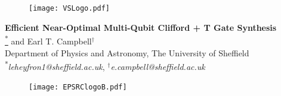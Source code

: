 \documentclass[a0,landscape]{a0poster}
\begin{document}
\pagecolor{gray!25} %

\begin{minipage}[t]{0.2\linewidth}
\begin{figure}
  \centering
  \texttt{[image: VSLogo.pdf]} 
\end{figure}
\end{minipage}
%
\begin{minipage}[t]{0.60\linewidth}
\begin{center}
\color{white}
\Huge \color{black}  \textbf{\textsf{Efficient Near-Optimal Multi-Qubit Clifford + T Gate Synthesis\\}} 
\huge \textsf{\underline{\textsuperscript{*}} and Earl T. Campbell$^\dagger$}\\  \Large
\vspace{0.5cm}Department of Physics and Astronomy, The University of Sheffield \\ \textsuperscript{*}\textit{leheyfron1@sheffield.ac.uk}, $^\dagger$\textit{e.campbell@sheffield.ac.uk}
\end{center}
\end{minipage}
%
\begin{minipage}[t]{0.2\linewidth}
\begin{figure}
\texttt{[image: EPSRClogoB.pdf]} 
\end{figure}
\end{minipage}
%

\vspace{1cm}

\normalsize
\end{document}
